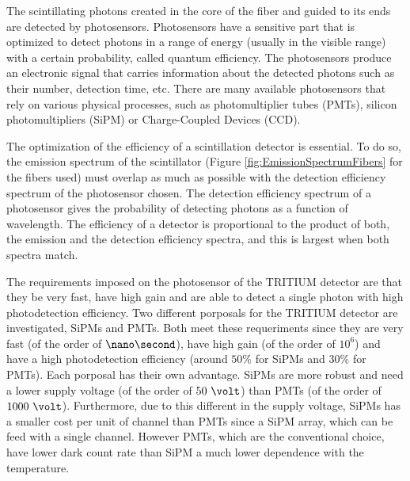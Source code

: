 The scintillating photons created in the core of the fiber and guided to its ends are detected by photosensors. Photosensors have a sensitive part that is optimized to detect photons in a range of energy (usually in the visible range) with a certain probability, called quantum efficiency. The photosensors produce an electronic signal that carries information about the detected photons such as their number, detection time, etc. There are many available photosensors that rely on various physical processes, such as photomultiplier tubes (PMTs), silicon photomultipliers (SiPM) or Charge-Coupled Devices (CCD).  %

The optimization of the efficiency of a scintillation detector is essential. To do so, the emission spectrum of the scintillator (Figure \ref{fig:EmissionSpectrumFibers} for the fibers used) must overlap as much as possible with the detection efficiency spectrum of the photosensor chosen. The detection efficiency spectrum of a photosensor gives the probability of detecting photons as a function of wavelength. The efficiency of a detector is proportional to the product of both, the emission and the detection efficiency spectra, and this is largest when both spectra match.

The requirements imposed on the photosensor of the TRITIUM detector are that they be very fast, have high gain and are able to detect a single photon with high photodetection efficiency. Two different porposals for the TRITIUM detector are investigated, SiPMs and PMTs. Both meet these requeriments since they are very fast (of the order of $\nano\second$), have high gain (of the order of $10^{6}$) and have a high photodetection efficiency (around $50\%$ for SiPMs and $30\%$ for PMTs). Each porposal has their own advantage. SiPMs are more robust and need a lower supply voltage (of the order of $50~\volt$) than PMTs (of the order of $1000~\volt$). Furthermore, due to this different in the supply voltage, SiPMs has a smaller cost per unit of channel than PMTs since a SiPM array, which can be feed with a single channel. However PMTs, which are the conventional choice, have lower dark count rate than SiPM a much lower dependence with the temperature.




